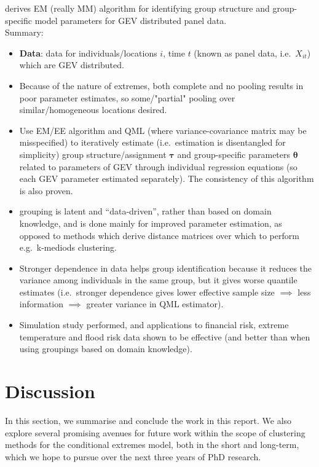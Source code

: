 \documentclass{article}
\numberwithin{equation}{section}
\begin{document}
\cite{Dupuis2023} derives EM (really MM) algorithm for identifying group structure and group-specific model parameters for GEV distributed panel data. \\
Summary:
\begin{itemize}
  \item \textbf{Data}: data for individuals/locations $i$, time $t$ (known as panel data, i.e.\ $X_{i t}$) which are GEV distributed. 
  \item Because of the nature of extremes, both complete and no pooling results in poor parameter estimates, so some/"partial" pooling over similar/homogeneous locations desired.
  \item Use EM/EE algorithm and QML (where variance-covariance matrix may be misspecified) to iteratively estimate (i.e.\ estimation is disentangled for simplicity) group structure/assignment $\bm{\tau}$ and group-specific parameters $\bm{\theta}$ related to parameters of GEV through individual regression equations (so each GEV parameter estimated separately). 
  The consistency of this algorithm is also proven.
  \item grouping is latent and ``data-driven'', rather than based on domain knowledge, and is done mainly for improved parameter estimation, as opposed to methods which derive distance matrices over which to perform e.g.\ k-mediods clustering. 
  \item Stronger dependence in data helps group identification because it reduces the variance among individuals in the same group, but it gives worse quantile estimates (i.e.\ stronger dependence gives lower effective sample size $\implies$ less information $\implies$ greater variance in QML estimator).
  \item Simulation study performed, and applications to financial risk, extreme temperature and flood risk data shown to be effective (and better than when using groupings based on domain knowledge). 
\end{itemize}

\newpage
\section{Discussion} \label{sec:discussion}

In this section, we summarise and conclude the work in this report. 
We also explore several promising avenues for future work within the scope of clustering methods for the conditional extremes model, both in the short and long-term, which we hope to pursue over the next three years of PhD research. 
\end{document}
